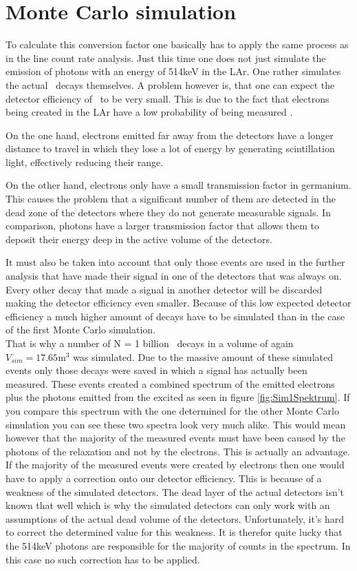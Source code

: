 \documentclass[encoding=utf8,british]{tumphthesis}
\begin{document}
\section{Monte Carlo simulation}
\label{sec:MonteCarlo2}

To calculate this conversion factor one basically has to apply the same process as in the line count rate analysis.
Just this time one does not just simulate the emission of photons with an energy of 514keV in the LAr.
One rather simulates the actual \Kr\ decays themselves.
A problem however is, that one can expect the detector efficiency of \Kr\ to be very small.
This is due to the fact that electrons being created in the LAr have a low probability of being measured .

On the one hand, electrons emitted far away from the detectors have a longer distance to travel in which they lose a lot of energy by generating scintillation light, effectively reducing their range.

On the other hand, electrons only have a small transmission factor in germanium.
This causes the problem that a significant number of them are detected in the dead zone of the detectors where they do not generate measurable signals.
In comparison, photons have a larger transmission factor that allows them to deposit their energy deep in the active volume of the detectors.

It must also be taken into account that only those events are used in the further analysis that have made their signal in one of the detectors that was always on.
Every other decay that made a signal in another detector will be discarded making the detector efficiency even smaller. 
Because of this low expected detector efficiency a much higher amount of decays have to be simulated than in the case of the first Monte Carlo simulation.
\\

That is why a number of N = 1 billion \Kr\ decays in a volume of again $V_{sim} = 17.65 \mathrm{m}^3$ was simulated.
Due to the massive amount of these simulated events only those decays were saved in which a signal has actually been measured.
These events created a combined spectrum of the emitted electrons plus the photons emitted from the excited  as seen in figure \ref{fig:Sim1Spektrum}.
If you compare this spectrum with the one determined for the other Monte Carlo simulation you can see these two spectra look very much alike.
This would mean however that the majority of the measured events must have been caused by the photons of the  relaxation and not by the electrons.
This is actually an advantage.
If the majority of the measured events were created by electrons then one would have to apply a correction onto our detector efficiency.
This is because of a weakness of the simulated detectors.
The dead layer of the actual detectors isn't known that well which is why the simulated detectors can only work with an assumptions of the actual dead volume of the detectors.
Unfortunately, it's hard to correct the determined value for this weakness.
It is therefor quite lucky that the 514keV photons are responsible for the majority of counts in the spectrum.
In this case no such correction has to be applied.
\\
\end{document}
